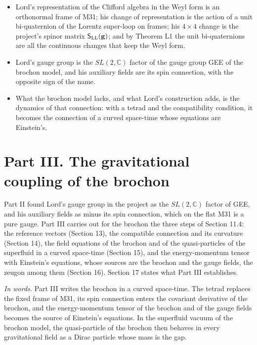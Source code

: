 \documentclass[
  10pt,
]{article}
\providecommand{\tightlist}{%
  \setlength{\itemsep}{0pt}\setlength{\parskip}{0pt}}
\begin{document}
\begin{itemize}
\tightlist
\item
  Lord's representation of the Clifford algebra in the Weyl form is an
  orthonormal frame of M31; his change of representation is the action
  of a unit bi-quaternion of the Lorentz super-loop on frames; his
  \(4\times4\) change is the project's spinor matrix
  \(\mathsf S_{\rm LL}(\mathbf g)\); and by Theorem L1 the unit
  bi-quaternions are all the continuous changes that keep the Weyl form.
\item
  Lord's gauge group is the \(SL(2,\mathbb C)\) factor of the gauge
  group GEE of the brochon model, and his auxiliary fields are its spin
  connection, with the opposite sign of the name.
\item
  What the brochon model lacks, and what Lord's construction adds, is
  the dynamics of that connection: with a tetrad and the compatibility
  condition, it becomes the connection of a curved space-time whose
  equations are Einstein's.
\end{itemize}

\hypertarget{part-iii.-the-gravitational-coupling-of-the-brochon}{%
\section{Part III. The gravitational coupling of the
brochon}\label{part-iii.-the-gravitational-coupling-of-the-brochon}}

Part II found Lord's gauge group in the project as the
\(SL(2,\mathbb C)\) factor of GEE, and his auxiliary fields as minus its
spin connection, which on the flat M31 is a pure gauge. Part III carries
out for the brochon the three steps of Section 11.4: the reference
vectors (Section 13), the compatible connection and its curvature
(Section 14), the field equations of the brochon and of the
quasi-particles of the superfluid in a curved space-time (Section 15),
and the energy-momentum tensor with Einstein's equations, whose sources
are the brochon and the gauge fields, the zeugon among them (Section
16). Section 17 states what Part III establishes.

\emph{In words.} Part III writes the brochon in a curved space-time. The
tetrad replaces the fixed frame of M31, its spin connection enters the
covariant derivative of the brochon, and the energy-momentum tensor of
the brochon and of the gauge fields becomes the source of Einstein's
equations. In the superfluid vacuum of the brochon model, the
quasi-particle of the brochon then behaves in every gravitational field
as a Dirac particle whose mass is the gap.
\end{document}
